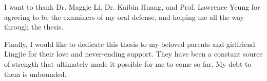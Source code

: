 I want to thank Dr. Maggie Li, Dr. Kaibin Huang, and Prof. Lawrence Yeung 
for agreeing to be the examiners of my oral defense, and  helping me all the way through the thesis. %

Finally, I would like to dedicate this thesis to my beloved parents and girlfriend Lingjie for their love and never-ending support.
They have been a constant source of strength that ultimately made it possible for me to come so far. 
My debt to them is unbounded.

